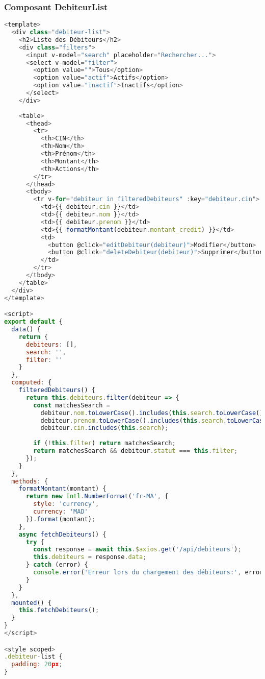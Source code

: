 \documentclass[12pt,a4paper]{report}
\begin{document}
\subsubsection{Composant DebiteurList}
\begin{lstlisting}[language=JavaScript]
<template>
  <div class="debiteur-list">
    <h2>Liste des Débiteurs</h2>
    <div class="filters">
      <input v-model="search" placeholder="Rechercher...">
      <select v-model="filter">
        <option value="">Tous</option>
        <option value="actif">Actifs</option>
        <option value="inactif">Inactifs</option>
      </select>
    </div>
    
    <table>
      <thead>
        <tr>
          <th>CIN</th>
          <th>Nom</th>
          <th>Prénom</th>
          <th>Montant</th>
          <th>Actions</th>
        </tr>
      </thead>
      <tbody>
        <tr v-for="debiteur in filteredDebiteurs" :key="debiteur.cin">
          <td>{{ debiteur.cin }}</td>
          <td>{{ debiteur.nom }}</td>
          <td>{{ debiteur.prenom }}</td>
          <td>{{ formatMontant(debiteur.montant_credit) }}</td>
          <td>
            <button @click="editDebiteur(debiteur)">Modifier</button>
            <button @click="deleteDebiteur(debiteur)">Supprimer</button>
          </td>
        </tr>
      </tbody>
    </table>
  </div>
</template>

<script>
export default {
  data() {
    return {
      debiteurs: [],
      search: '',
      filter: ''
    }
  },
  computed: {
    filteredDebiteurs() {
      return this.debiteurs.filter(debiteur => {
        const matchesSearch = 
          debiteur.nom.toLowerCase().includes(this.search.toLowerCase()) ||
          debiteur.prenom.toLowerCase().includes(this.search.toLowerCase()) ||
          debiteur.cin.includes(this.search);
        
        if (!this.filter) return matchesSearch;
        return matchesSearch && debiteur.statut === this.filter;
      });
    }
  },
  methods: {
    formatMontant(montant) {
      return new Intl.NumberFormat('fr-MA', {
        style: 'currency',
        currency: 'MAD'
      }).format(montant);
    },
    async fetchDebiteurs() {
      try {
        const response = await this.$axios.get('/api/debiteurs');
        this.debiteurs = response.data;
      } catch (error) {
        console.error('Erreur lors du chargement des débiteurs:', error);
      }
    }
  },
  mounted() {
    this.fetchDebiteurs();
  }
}
</script>

<style scoped>
.debiteur-list {
  padding: 20px;
}


\end{lstlisting}
\end{document}
